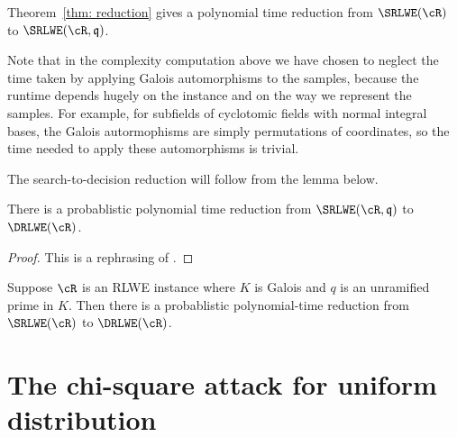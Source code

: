 \documentclass{amsart}
\begin{document}
Theorem~\ref{thm: reduction} gives a polynomial time reduction from $\SRLWE(\cR)$ to $\SRLWE(\cR,\fq)$.

\begin{remark}
Note that in the complexity computation above we have chosen to neglect the time taken by applying Galois automorphisms to the samples, because the runtime depends
hugely on the instance and on the way we represent the samples. For example, for subfields of cyclotomic fields with normal integral bases, the Galois autormophisms are simply permutations of coordinates, so the time needed to apply these automorphisms is trivial.
\end{remark}


The search-to-decision reduction will follow from the lemma below.
\begin{Lemma}
There is a probablistic polynomial time reduction from $\SRLWE(\cR,\fq)$ to $\DRLWE(\cR)$.
\end{Lemma}

\begin{proof}
This is a rephrasing of \cite[Lemma 5.9 and Lemma 5.12 ]{lyubashevsky2013ideal}.
\end{proof}

\begin{Corollary}\label{cor: s-to-d}
Suppose $\cR$ is an RLWE instance where $K$ is Galois and $q$ is an unramified prime in $K$. Then there is a probablistic polynomial-time reduction from $\SRLWE(\cR)$ to $\DRLWE(\cR)$.
\end{Corollary}

\section{The chi-square attack for uniform distribution}
\label{sec: chi-square}
\end{document}
